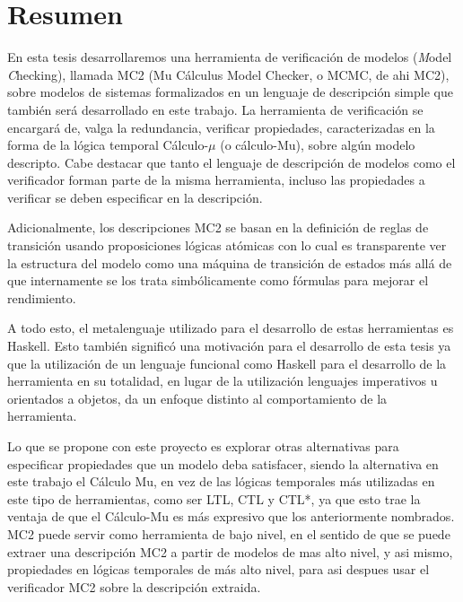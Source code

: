 % 
% 
%
\chapter*{Resumen}

En esta tesis desarrollaremos una herramienta de verificación de modelos (\emph Model \emph Checking), llamada MC2 (Mu Cálculus Model Checker, o MCMC, de ahi MC2), sobre modelos de sistemas formalizados en un lenguaje de descripción simple que también será desarrollado en este trabajo. La herramienta de verificación se encargará de, valga la redundancia, verificar propiedades, caracterizadas en la forma de la lógica temporal Cálculo-$\mu$ (o cálculo-Mu), sobre algún modelo descripto. Cabe destacar que tanto el lenguaje de descripción de modelos como el verificador forman parte de la misma herramienta, incluso las propiedades a verificar se deben especificar en la descripción.

Adicionalmente, los descripciones MC2 se basan en la definición de reglas de transición usando proposiciones lógicas atómicas con lo cual es transparente ver la estructura del modelo como una máquina de transición de estados más allá de que internamente se los trata simbólicamente como fórmulas para mejorar el rendimiento.

A todo esto, el metalenguaje utilizado para el desarrollo de estas herramientas es Haskell. Esto también significó una motivación para el desarrollo de esta tesis ya que la utilización de un lenguaje funcional como Haskell para el desarrollo de la herramienta en su totalidad, en lugar de la utilización lenguajes imperativos u orientados a objetos, da un enfoque distinto al comportamiento de la herramienta.

Lo que se propone con este proyecto es explorar otras alternativas para especificar propiedades que un modelo deba satisfacer, siendo la alternativa en este trabajo el Cálculo Mu, en vez de las lógicas temporales más utilizadas en este tipo de herramientas, como ser LTL, CTL y CTL*, ya que esto trae la ventaja de que el Cálculo-Mu es más expresivo que los anteriormente nombrados. MC2 puede servir como herramienta de bajo nivel, en el sentido de que se puede extraer una descripción MC2 a partir de modelos de mas alto nivel, y asi mismo, propiedades en lógicas temporales de más alto nivel, para asi despues usar el verificador MC2 sobre la descripción extraida.


